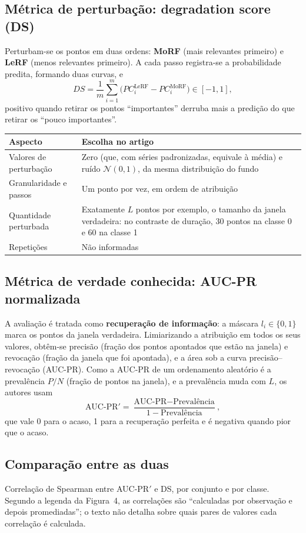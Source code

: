 \documentclass[11pt,a4paper]{article}
\begin{document}
\subsection{Métrica de perturbação: degradation score (DS)}
Perturbam-se os pontos em duas ordens: \textbf{MoRF} (mais relevantes primeiro) e \textbf{LeRF} (menos relevantes primeiro). A cada passo registra-se a probabilidade predita, formando duas curvas, e
\[
DS = \frac{1}{m}\sum_{i=1}^{m}\big(PC^{\text{LeRF}}_i - PC^{\text{MoRF}}_i\big) \in [-1,1],
\]
positivo quando retirar os pontos “importantes” derruba mais a predição do que retirar os “pouco importantes”.
\begin{center}\small
\begin{tabularx}{\linewidth}{lX}
\toprule
\textbf{Aspecto} & \textbf{Escolha no artigo} \\
\midrule
Valores de perturbação & Zero (que, com séries padronizadas, equivale à média) e ruído $\mathcal{N}(0,1)$, da mesma distribuição do fundo \\
Granularidade e passos & Um ponto por vez, em ordem de atribuição \\
Quantidade perturbada & Exatamente $L$ pontos por exemplo, o tamanho da janela verdadeira: no contraste de duração, 30 pontos na classe 0 e 60 na classe 1 \\
Repetições & Não informadas \\
\bottomrule
\end{tabularx}
\end{center}

\subsection{Métrica de verdade conhecida: AUC-PR normalizada}
A avaliação é tratada como \textbf{recuperação de informação}: a máscara $l_i \in \{0,1\}$ marca os pontos da janela verdadeira. Limiarizando a atribuição em todos os seus valores, obtêm-se precisão (fração dos pontos apontados que estão na janela) e revocação (fração da janela que foi apontada), e a área sob a curva precisão--revocação (AUC-PR). Como a AUC-PR de um ordenamento aleatório é a prevalência $P/N$ (fração de pontos na janela), e a prevalência muda com $L$, os autores usam
\[
\text{AUC-PR}' = \frac{\text{AUC-PR} - \text{Prevalência}}{1 - \text{Prevalência}},
\]
que vale 0 para o acaso, 1 para a recuperação perfeita e é negativa quando pior que o acaso.

\subsection{Comparação entre as duas}
Correlação de Spearman entre AUC-PR$'$ e DS, por conjunto e por classe. Segundo a legenda da Figura~4, as correlações são “calculadas por observação e depois promediadas”; o texto não detalha sobre quais pares de valores cada correlação é calculada.
\end{document}
